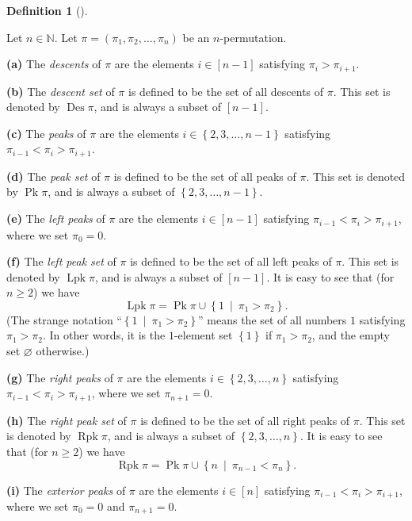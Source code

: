 \documentclass[numbers=enddot,12pt,final,onecolumn,notitlepage]{scrartcl}%
\theoremstyle{definition}
\newtheorem{defi}[theo]{Definition}
\newenvironment{definition}[1][]
{\begin{defi}[#1]\begin{leftbar}}
{\end{leftbar}\end{defi}}
\begin{document}
\begin{definition}
\label{def.Des-et-al}Let $n\in\mathbb{N}$. Let $\pi=\left(  \pi_{1},\pi
_{2},\ldots,\pi_{n}\right)  $ be an $n$-permutation.

\textbf{(a)} The \textit{descents} of $\pi$ are the elements $i\in\left[
n-1\right]  $ satisfying $\pi_{i}>\pi_{i+1}$.

\textbf{(b)} The \textit{descent set} of $\pi$ is defined to be the set of all
descents of $\pi$. This set is denoted by $\operatorname{Des}\pi$, and is
always a subset of $\left[  n-1\right]  $.

\textbf{(c)} The \textit{peaks} of $\pi$ are the elements $i\in\left\{
2,3,\ldots,n-1\right\}  $ satisfying $\pi_{i-1}<\pi_{i}>\pi_{i+1}$.

\textbf{(d)} The \textit{peak set} of $\pi$ is defined to be the set of all
peaks of $\pi$. This set is denoted by $\operatorname*{Pk}\pi$, and is always
a subset of $\left\{  2,3,\ldots,n-1\right\}  $.

\textbf{(e)} The \textit{left peaks} of $\pi$ are the elements $i\in\left[
n-1\right]  $ satisfying $\pi_{i-1}<\pi_{i}>\pi_{i+1}$, where we set $\pi
_{0}=0$.

\textbf{(f)} The \textit{left peak set} of $\pi$ is defined to be the set of
all left peaks of $\pi$. This set is denoted by $\operatorname*{Lpk}\pi$, and
is always a subset of $\left[  n-1\right]  $. It is easy to see that (for
$n\geq2$) we have%
\[
\operatorname*{Lpk}\pi=\operatorname*{Pk}\pi\cup\left\{  1\ \mid\ \pi_{1}%
>\pi_{2}\right\}  .
\]
(The strange notation ``$\left\{  1\ \mid\ \pi_{1}>\pi_{2}\right\}  $''
means the set of all numbers $1$ satisfying $\pi_1 > \pi_2$.
In other words, it is the $1$-element
set $\left\{  1\right\}  $ if $\pi_{1}>\pi_{2}$, and the empty set
$\varnothing$ otherwise.)

\textbf{(g)} The \textit{right peaks} of $\pi$ are the elements $i\in\left\{
2,3,\ldots,n\right\}  $ satisfying $\pi_{i-1}<\pi_{i}>\pi_{i+1}$, where we set
$\pi_{n+1}=0$.

\textbf{(h)} The \textit{right peak set} of $\pi$ is defined to be the set of
all right peaks of $\pi$. This set is denoted by $\operatorname*{Rpk}\pi$, and
is always a subset of $\left\{  2,3,\ldots,n\right\}  $. It is easy to see
that (for $n\geq2$) we have%
\[
\operatorname*{Rpk}\pi=\operatorname*{Pk}\pi\cup\left\{  n\ \mid\ \pi
_{n-1}<\pi_{n}\right\}  .
\]


\textbf{(i)} The \textit{exterior peaks} of $\pi$ are the elements
$i\in\left[  n\right]  $ satisfying $\pi_{i-1}<\pi_{i}>\pi_{i+1}$, where we
set $\pi_{0}=0$ and $\pi_{n+1}=0$.


\end{definition}
\end{document}
